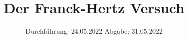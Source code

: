 

\subject{V601}
\title{Der Franck-Hertz Versuch}
\date{%
  Durchführung: 24.05.2022
  \hspace{3em}
  Abgabe: 31.05.2022
}



\maketitle
\thispagestyle{empty}
\tableofcontents
\newpage






\printbibliography{}


